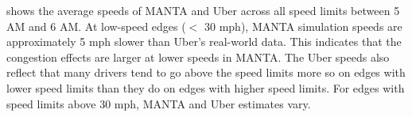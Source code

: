 \documentclass[final]{IEEEtran}
\begin{document}

 shows the average speeds of MANTA and Uber across all speed limits between 5 AM and 6 AM. At low-speed edges ($<$ 30 mph), MANTA simulation speeds are approximately 5 mph slower than Uber's real-world data. This indicates that the congestion effects are larger at lower speeds in MANTA. The Uber speeds also reflect that many drivers tend to go above the speed limits more so on edges with lower speed limits than they do on edges with higher speed limits. For edges with speed limits above 30 mph, MANTA and Uber estimates vary.
\end{document}
